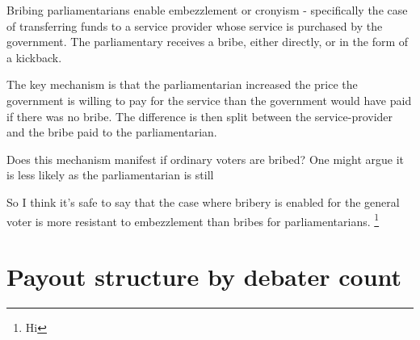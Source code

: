 \documentclass[9pt]{article}
\begin{document}
Bribing parliamentarians enable embezzlement or cronyism - specifically the case of transferring funds to a service provider whose service is purchased by the government. The parliamentary receives a bribe, either directly, or in the form of a kickback.

The key mechanism is that the parliamentarian increased the price the government is willing to pay for the service than the government would have paid if there was no bribe. The difference is then split between the service-provider and the bribe paid to the parliamentarian.

Does this mechanism manifest if ordinary voters are bribed? One might argue it is less likely as the parliamentarian is still

So I think it's safe to say that the case where bribery is enabled for the general voter is more resistant to embezzlement than bribes for parliamentarians. \footnote{Hi}

\section{Payout structure by debater count}
\end{document}
